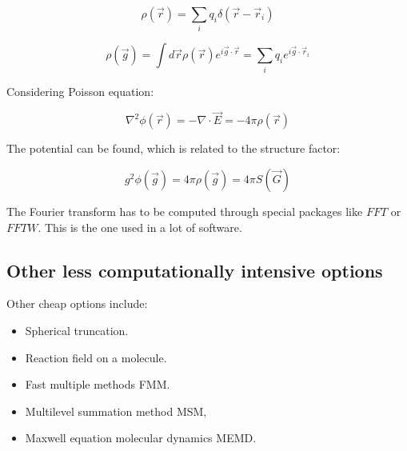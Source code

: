 	$$\rho(\vec{r}) = \sum\limits_{i}q_i\delta(\vec{r}-\vec{r}_i)$$

	$$\rho(\vec{g}) = \int d\vec{r}\rho(\vec{r})e^{i\vec{g}\cdot\vec{r}} = \sum\limits_i q_i e^{i\vec{g}\cdot\vec{r}_i}$$

	Considering Poisson equation:

	$$\nabla^2\phi(\vec{r}) = -\nabla\cdot\vec{E} = -4\pi\rho(\vec{r})$$

	The potential can be found, which is related to the structure factor:

	$$g^2\phi(\vec{g}) = 4\pi\rho(\vec{g}) = 4\pi S(\vec{G})$$

	The Fourier transform has to be computed through special packages like $FFT$ or $FFTW$.
	This is the one used in a lot of software.

	\subsection{Other less computationally intensive options}
	Other cheap options include:

	\begin{multicols}{2}
		\begin{itemize}
			\item Spherical truncation.
			\item Reaction field on a molecule.
			\item Fast multiple methods FMM.
			\item Multilevel summation method MSM,
			\item Maxwell equation molecular dynamics MEMD.
		\end{itemize}
	\end{multicols}
